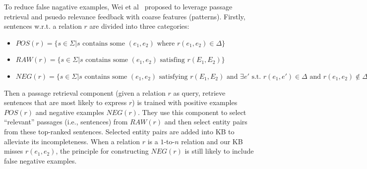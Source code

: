 \documentclass[10pt]{article} %
\theoremstyle{definition}
\theoremstyle{definition}
\begin{document}
To reduce false nagative examples, Wei et al~\cite{passageretrieval} proposed to leverage passage retrieval and psuedo relevance feedback with coarse features (patterns). 
Firstly, sentences w.r.t. a relation $r$ are divided into three categories: 
\begin{itemize}
\item $POS(r)=\{s\in\Sigma\vert{}s\text{ contains some }(e_1,e_2)\text{ where }r(e_1,e_2)\in\Delta\}$ 
\item $RAW(r)=\{s\in\Sigma\vert{}s\text{ contains some }(e_1,e_2)\text{ satisfing }r(E_1, E_2)\}$ 
\item $NEG(r)=\{s\in\Sigma\vert{}s\text{ contains some }(e_1,e_2)\text{ satisfying }r(E_1, E_2)\text{ and }\exists{}e'\text{ s.t. }r(e_1,e')\in\Delta\text{ and }r(e_1,e_2)\notin\Delta\}$ 
\end{itemize}
Then a passage retrieval component (given a relation $r$ as query, retrieve sentences that are most likely to express $r$) is trained with positive examples $POS(r)$ and negative examples $NEG(r)$. 
They use this component to select ``relevant'' passages (i.e., sentences) from $RAW(r)$ and then select entity pairs from these top-ranked sentences. 
Selected entity pairs are added into KB to alleviate its incompleteness. 
When a relation $r$ is a $1$-to-$n$ relation and our KB misses $r(e_1, e_2)$, the principle for constructing $NEG(r)$ is still likely to include false negative examples. 
\end{document}
